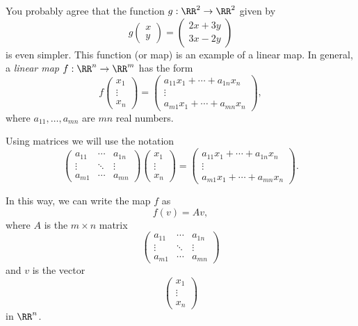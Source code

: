 \documentclass{article}
\begin{document}
You probably agree that the function $g:\RR^2\rightarrow \RR^2$ given by
$$
g\begin{pmatrix}
  x \\ y
\end{pmatrix} =
\begin{pmatrix}
  2 x + 3 y\\
  3 x - 2 y
\end{pmatrix}
$$
is even simpler. This function (or map) is an example of a linear map.
In general, a \emph{linear map}
$f: \RR^n\rightarrow \RR^m$ has the form
$$
f\begin{pmatrix}
  x_1 \\ \vdots \\ x_n
\end{pmatrix} =
\begin{pmatrix}
  a_{11} x_1 + \cdots + a_{1 n} x_n\\
  \vdots \\
  a_{m1} x_1 + \cdots + a_{m n} x_n
\end{pmatrix},
$$
where $a_{11}, \dots, a_{mn}$ are $m n$ real numbers.

Using matrices we will use the notation
$$
\begin{pmatrix}
a_{11} & \cdots & a_{1n}\\
\vdots & \ddots & \vdots\\
a_{m1} & \cdots & a_{mn}
\end{pmatrix}
\begin{pmatrix} x_1 \\ \vdots \\ x_n\end{pmatrix} =
\begin{pmatrix}
  a_{11} x_1 + \cdots + a_{1 n} x_n\\
  \vdots \\
  a_{m1} x_1 + \cdots + a_{m n} x_n
\end{pmatrix}.
$$


In this way, we can write the map $f$ as
$$
f(v) = A v,
$$
where $A$ is the $m\times n$ matrix
$$
\begin{pmatrix}
a_{11} & \cdots & a_{1n}\\
\vdots & \ddots & \vdots\\
a_{m1} & \cdots & a_{mn}
\end{pmatrix}
$$
and $v$ is the vector
$$
\begin{pmatrix} x_1 \\ \vdots \\ x_n\end{pmatrix}
$$
in $\RR^n$.
\end{document}

